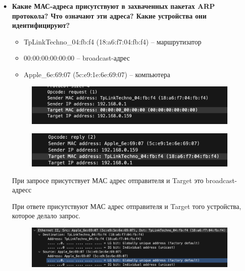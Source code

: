 \documentclass[12pt,onecolumn]{article}
\begin{document}
\begin{itemize}
    \item {
        \textbf{Какие МАС-адреса присутствуют в захваченных пакетах ARP протокола? Что означают эти адреса? Какие устройства они идентифицируют?}
        \begin{itemize}
            \item TpLinkTechno\_04:fb:f4 (18:a6:f7:04:fb:f4) -- маршрутизатор
            \item 00:00:00:00:00:00 -- broadcast-адрес
            \item Apple\_6e:69:07 (5c:e9:1e:6e:69:07) -- компьютера
        \end{itemize}
        \begin{figure}[H]
            \centering
            \includegraphics*[width=\textwidth]{image/part5/arp-rq.png}
        \end{figure}
        \begin{figure}[H]
            \centering
            \includegraphics*[width=\textwidth]{image/part5/arp-reply.png}
        \end{figure}
        
        При запросе присутствует МАС адрес отправителя и Target это broadcast-адресс

        При ответе присутствуют МАС адрес отправителя и Target того устройства, которое делало запрос.

        \begin{figure}[H]
            \centering
            \includegraphics*[width=\textwidth]{image/part5/factory-def.png}
        \end{figure}

}
\end{itemize}
\end{document}

